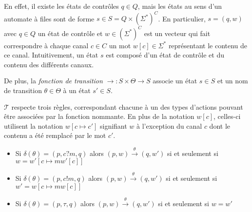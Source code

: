 En effet, il existe les états de contrôles $q\in Q$, mais les états au sens d'un automate à files sont de forme $s \in S=Q\times(\Sigma^*)^C$. En particulier, $s=(q,w)$ avec $q\in Q$ un état de contrôle et $w\in (\Sigma^*)^C$ est un vecteur qui fait correspondre à chaque canal $c\in C$ un mot $w[c] \in \Sigma^*$ représentant le contenu de ce canal. Intuitivement, un état $s$ est composé d'un état de contrôle et du contenu des différents canaux.

De plus, la \emph{fonction de transition} $\rightarrow:S\times\Theta\rightarrow S$ associe un état $s\in S$ et un nom de transition $\theta\in\Theta$ à un état $s'\in S$.

$\mathcal{T}$ respecte trois règles, correspondant chacune à un des types d'actions pouvant être associées par la fonction nommante. En plus de la notation $w[c]$, celles-ci utilisent la notation $w[c\mapsto c']$ signifiant $w$ à l'exception du canal $c$ dont le contenu a été remplacé par le mot $c'$.
\begin{itemize}
  \item Si $\delta(\theta)=(p,c?m,q)$ alors $(p,w)\xrightarrow{\theta}(q,w')$ si et seulement si $w=w'[c\mapsto mw'[c]]$
  \item Si $\delta(\theta)=(p,c!m,q)$ alors $(p,w)\xrightarrow{\theta}(q,w')$ si et seulement si $w'=w[c\mapsto mw[c]]$
  \item Si $\delta(\theta)=(p,\tau,q)$ alors $(p,w)\xrightarrow{\theta}(q,w')$ si et seulement si $w=w'$
\end{itemize}

